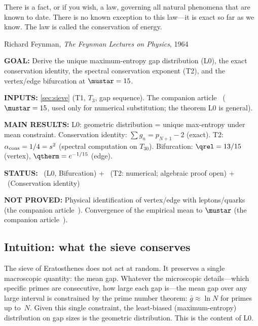 \documentclass[12pt,a4paper]{article}
\begin{document}
\epigraph{There is a fact, or if you wish, a law, governing all natural
phenomena that are known to date. There is no known exception to this
law---it is exact so far as we know. The law is called the conservation
of energy.}{Richard Feynman, \textit{The Feynman Lectures on Physics}, 1964}

\begin{statusbox}
\textbf{GOAL:}
  Derive the unique maximum-entropy gap distribution (L0), the exact
  conservation identity, the spectral conservation exponent (T2), and
  the vertex/edge bifurcation at $\mustar = 15$.

\textbf{INPUTS:}
  \cref{sec:sieve} (T1, $T_3$, gap sequence). The companion article~\cite{companion_M3} ($\mustar = 15$,
  used only for numerical substitution; the theorem L0 is general).

\textbf{MAIN RESULTS:}
  L0: geometric distribution = unique max-entropy under mean constraint.
  Conservation identity: $\sum g_n = p_{N+1} - 2$ (exact).
  T2: $\alpha_{\rm cons} = 1/4 = s^2$ (spectral computation on $T_{30}$).
  Bifurcation: $\qrel = 13/15$ (vertex), $\qtherm = e^{-1/15}$ (edge).

\textbf{STATUS:}
  \THMTAG~(L0, Bifurcation) + \VALTAG~(T2: numerical; algebraic proof open) + \IDTAG~(Conservation identity)

\textbf{NOT PROVED:}
  Physical identification of vertex/edge with leptons/quarks (the companion article~\cite{companion_M5}).
  Convergence of the empirical mean to $\mustar$ (the companion article~\cite{companion_M3}).
\end{statusbox}

\subsection{Intuition: what the sieve conserves}
\label{sec:ch3_intuition}

The sieve of Eratosthenes does not act at random. It preserves a
single macroscopic quantity: the mean gap. Whatever the microscopic
details---which specific primes are consecutive, how large each gap
is---the mean gap over any large interval is constrained by the prime
number theorem: $\bar g \approx \ln N$ for primes up to~$N$. Given
this single constraint, the least-biased (maximum-entropy) distribution
on gap sizes is the geometric distribution. This is the content of L0.
\end{document}
